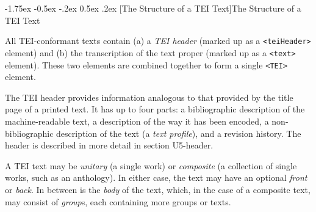 \documentclass[11pt,twoside]{article}\makeatletter
\makeatletter
\renewcommand\section{\@startsection {section}{1}{\z@}%
     {-1.75ex \@plus -0.5ex \@minus -.2ex}%
     {0.5ex \@plus .2ex}%
     {\reset@font\Large\bfseries\sffamily}}
\makeatother
\begin{document}
\section[{The Structure of a TEI Text}]{The Structure of a TEI Text}\label{U5-struc}\par
All TEI-conformant texts contain (a) a \textit{TEI header} (marked up as a \texttt{<teiHeader>} element) and (b) the transcription of the text proper (marked up as a \texttt{<text>} element). These two elements are combined together to form a single \texttt{<TEI>} element.\par
The TEI header provides information analogous to that provided by the title page of a printed text. It has up to four parts: a bibliographic description of the machine-readable text, a description of the way it has been encoded, a non-bibliographic description of the text (a \textit{text profile}), and a revision history. The header is described in more detail in section U5-header.\par
A TEI text may be \textit{unitary} (a single work) or \textit{composite} (a collection of single works, such as an anthology). In either case, the text may have an optional \textit{front} or \textit{back}. In between is the \textit{body} of the text, which, in the case of a composite text, may consist of \textit{group}s, each containing more groups or texts.\par
\end{document}

